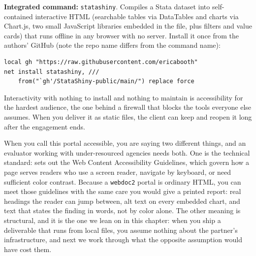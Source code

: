 \begin{kaobox}[frametitle=Package Integration: \texttt{statashiny}]
\textbf{Integrated command:} \texttt{statashiny}. Compiles a Stata dataset into self-contained interactive HTML (searchable tables via DataTables and charts via Chart.js, two small JavaScript libraries embedded in the file, plus filters and value cards) that runs offline in any browser with no server. Install it once from the authors' GitHub (note the repo name differs from the command name):
\par
{\footnotesize
\begin{verbatim}
local gh "https://raw.githubusercontent.com/ericabooth"
net install statashiny, ///
    from("`gh'/StataShiny-public/main/") replace force
\end{verbatim}
}
\end{kaobox}

Interactivity with nothing to install and nothing to maintain is accessibility for the hardest audience, the one behind a firewall that blocks the tools everyone else assumes. When you deliver it as static files, the client can keep and reopen it long after the engagement ends.

When you call this portal accessible, you are saying two different things, and an evaluator working with under-resourced agencies needs both. One is the technical standard: \textcite{w3c2018wcag} sets out the Web Content Accessibility Guidelines, which govern how a page serves readers who use a screen reader, navigate by keyboard, or need sufficient color contrast. Because a \texttt{webdoc2} portal is ordinary HTML, you can meet those guidelines with the same care you would give a printed report: real headings the reader can jump between, alt text on every embedded chart, and text that states the finding in words, not by color alone. The other meaning is structural, and it is the one we lean on in this chapter: when you ship a deliverable that runs from local files, you assume nothing about the partner's infrastructure, and next we work through what the opposite assumption would have cost them.

